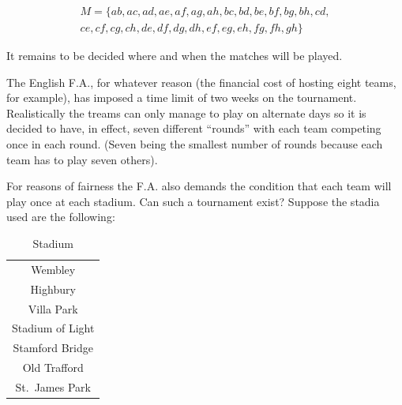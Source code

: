 \documentclass[
  12pt,
  a4paper]{book}
\begin{document}
\begin{equation*}
\begin{split}
M = \{
  ab,ac,ad,ae,af,ag,ah,bc,bd,be,bf,bg,bh,cd,\\
  ce,cf,cg,ch,de,df,dg,dh,ef,eg,eh,fg,fh,gh
\}
\end{split}
\end{equation*}

It remains to be decided where and when the matches will be played.

The English F.A., for whatever reason (the financial cost of hosting
eight teams, for example), has imposed a time limit of two weeks on the
tournament. Realistically the treams can only manage to play on
alternate days so it is decided to have, in effect, seven different
``rounds'' with each team competing once in each round. (Seven being
the smallest number of rounds because each team has to play seven
others).

For reasons of fairness the F.A. also demands the condition that each
team will play once at each stadium.
Can such a tournament exist?
Suppose the stadia used are the following:

\begin{longtable}[]{@{}c@{}}
\caption{\label{tab:stadium}Stadium}\tabularnewline
\toprule
\endhead
\begin{minipage}[t]{0.26\columnwidth}\centering
Wembley\strut
\end{minipage}\tabularnewline
\begin{minipage}[t]{0.26\columnwidth}\centering
Highbury\strut
\end{minipage}\tabularnewline
\begin{minipage}[t]{0.26\columnwidth}\centering
Villa Park\strut
\end{minipage}\tabularnewline
\begin{minipage}[t]{0.26\columnwidth}\centering
Stadium of Light\strut
\end{minipage}\tabularnewline
\begin{minipage}[t]{0.26\columnwidth}\centering
Stamford Bridge\strut
\end{minipage}\tabularnewline
\begin{minipage}[t]{0.26\columnwidth}\centering
Old Trafford\strut
\end{minipage}\tabularnewline
\begin{minipage}[t]{0.26\columnwidth}\centering
St.~James Park\strut
\end{minipage}\tabularnewline
\bottomrule
\end{longtable}
\end{document}
